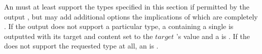 An  must at least support the types specified in this section if permitted by the output , but may add additional options the implications of which are completely . If the output  does not support a particular type, a  containing a single   is outputted with its target and content set to the \inline$target$ 's value and a  is . If the  does not support the requested type at all, an  is . \\





